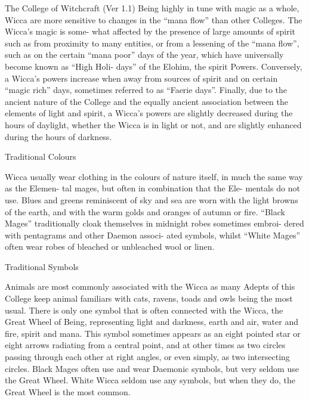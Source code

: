 \begin{Chapter}{The College of Witchcraft (Ver 1.1)}
Being highly in tune with magic as a whole, Wicca 
are  more  sensitive  to  changes  in  the  “mana  flow” 
than  other  Colleges.  The  Wicca’s  magic  is  some-
what  affected by  the  presence  of  large  amounts  of 
spirit  such  as  from  proximity  to  many  entities,  or 
from  a  lessening  of  the  “mana  flow”,  such  as  on 
the  certain  “mana  poor”  days  of  the  year,  which 
have  universally  become  known  as  “High  Holi-
days” of the Elohim, the spirit Powers. Conversely, 
a  Wicca’s  powers  increase  when  away  from 
sources of spirit and on certain “magic rich” days, 
sometimes  referred  to  as  “Faerie  days”.  Finally, 
due  to  the  ancient  nature  of  the  College  and  the 
equally  ancient  association  between  the  elements 
of  light  and  spirit,  a  Wicca’s  powers  are  slightly 
decreased during the hours of daylight, whether the 
Wicca is in light or not, and are slightly  enhanced 
during the hours of darkness. 

Traditional Colours 

Wicca  usually  wear  clothing  in  the  colours  of 
nature itself, in much the same way as the Elemen-
tal  mages,  but  often  in  combination  that  the  Ele-
mentals  do  not  use.  Blues  and  greens  reminiscent 
of  sky  and  sea  are  worn  with  the  light  browns  of 
the earth, and with the warm golds and oranges of 
autumn  or  fire.  “Black  Mages”  traditionally  cloak 
themselves  in  midnight  robes  sometimes  embroi-
dered  with  pentagrams  and  other  Daemon  associ-
ated  symbols,  whilst  “White  Mages”  often  wear 
robes of bleached or unbleached wool or linen. 

Traditional Symbols 

Animals  are  most  commonly  associated  with  the 
Wicca as many Adepts of this College keep animal 
familiars  with  cats,  ravens,  toads  and  owls  being 
the  most  usual.  There  is  only  one  symbol  that  is 
often  connected  with  the  Wicca,  the  Great  Wheel 
of Being, representing light and darkness, earth and 
air,  water  and  fire,  spirit  and  mana.  This  symbol 
sometimes appears as an eight pointed star or eight 
arrows  radiating  from a  central  point,  and  at  other 
times  as  two  circles  passing  through  each  other  at 
right  angles,  or  even  simply,  as  two  intersecting 
circles. Black Mages often use and wear Daemonic 
symbols,  but  very  seldom  use  the  Great  Wheel. 
White  Wicca  seldom  use  any  symbols,  but  when 
they do, the Great Wheel is the most common. 


\end{Chapter}
